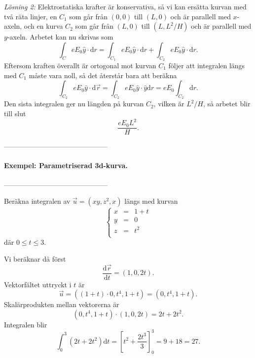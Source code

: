 \documentclass[%
oneside,                 %
final,                   %
10pt]{article}
\begin{document}
\emph{Lösning 2:}  Elektrostatiska krafter är konservativa, så vi kan ersätta kurvan med två räta linjer, en $C_1$ som går från $(0,0)$ till $(L,0)$ och är parallell med $x$-axeln, och en kurva $C_2$ som går från $(L,0)$ till $(L,L^2/H)$ och är parallell med $y$-axeln. Arbetet kan nu skrivas som
\begin{equation}
   \int_C eE_0 \hat{y} \cdot \mbox{d}r = \int_{C_1} eE_0 
\hat{y} \cdot \mbox{d}r + \int_{C_2} eE_0 \hat{y} \cdot \mbox{d}r.
\end{equation}
Eftersom kraften överallt är ortogonal mot kurvan $C_1$ följer att 
integralen längs med $C_1$ måste vara noll, så det återstår bara att beräkna
\begin{equation}
\int_{C_2} eE_0 \hat{y} \cdot \mbox{d} \vec{r} = \int_{C_2} 
e E_0 \hat{y} \cdot \hat{y} \mbox{d}r = e E_0 \int_{C_2} \mbox{d}r.
\end{equation}
Den sista integralen ger nu längden på kurvan $C_2$, vilken är $L^2/H$,
så arbetet blir till slut
\begin{equation}
  \frac{e E_0 L^2}{H}.
\end{equation}

---------------------------------------------

\paragraph{Exempel: Parametriserad 3d-kurva.}
---------------------------------------------

Beräkna integralen av $\vec{u} = (xy, z^2, x)$ längs med kurvan 
\begin{equation}
\left\{\begin{array}{lcl}
x & = & 1+t\\
y & = & 0\\
z & = & t^2\\
\end{array}\right. 
\end{equation}
där $0 \le t \le 3$.  

Vi beräknar då först 
\begin{equation}
  \frac{\mbox{d}\vec{r}}{\mbox{d}t} = (1, 0, 2t).
\end{equation}
Vektorfältet uttryckt i $t$ är
\begin{equation}
  \vec{u} = \left(\left(1+t\right) \cdot 0, t^4, 1+t\right) = 
\left(0,t^4,1+t\right).
\end{equation}
Skalärprodukten mellan vektorerna är
\begin{equation}
  \left(0,t^4,1+t\right) \cdot \left(1,0,2t\right) = 2t + 2t^2.
\end{equation}
Integralen blir
\begin{equation}
  \int_0^3 \left(2t+2t^2\right)\mbox{d}t = 
\left[t^2 + \frac{2t^3}{3}\right]_0^3 = 9 + 18 = 27.
\end{equation}
\end{document}
